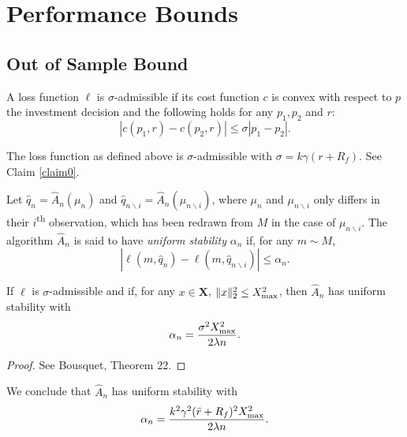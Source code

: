 \documentclass[11pt]{article}
\begin{document}
\section{Performance Bounds}

\subsection{Out of Sample Bound}

\begin{deff}
  A loss function $\ell$ is $\sigma$-admissible if its cost function $c$ is convex with
  respect to $p$ the investment decision and the following holds for any $p_1,p_2$ and
  $r$:
  \begin{equation*}
    |c(p_1,r) - c(p_2,r)| \leq \sigma|p_1-p_2|.
  \end{equation*}
\end{deff}

\begin{rem}
  The loss function as defined above is $\sigma$-admissible with $\sigma=k\gamma(r+R_f)$. See
  Claim \ref{claim0}.
\end{rem}

\begin{deff}
  Let $\hat q_n=\hat A_n(\mu_n)$ and
  $\hat q_{n\backslash i}=\hat A_n(\mu_{n\backslash i})$, where $\mu_n$ and
  $\mu_{n\backslash i}$ only differs in their $i$\textsuperscript{th} observation, which
  has been redrawn from $M$ in the case of $\mu_{n\backslash i}$. The algorithm $\hat A_n$
  is said to have \textsl{uniform stability} $\alpha_n$ if, for any $m\sim M$,
  \begin{equation*}
    |\ell(m,\hat q_n) - \ell(m,\hat q_{n\backslash i})| \leq \alpha_n. 
  \end{equation*}
\end{deff}

\begin{thm}
  If $\ell$ is $\sigma$-admissible and if, for any $x\in\bm X$, $\|x\|_2^2\leq X_{\max}^2$,
  then $\hat A_n$ has uniform stability with
  \begin{equation*}
    \alpha_n = \frac{\sigma^2 X_{\max}^2}{2\lambda n}.
  \end{equation*}
\end{thm}

\begin{proof}
  See Bousquet, Theorem 22. 
\end{proof}

\begin{rem}
  We conclude that $\hat A_n$ has uniform stability with
  \begin{equation*}
    \alpha_n = \frac{k^2\gamma^2(\bar r+R_f)^2X_{\max}^2}{2\lambda n}.
  \end{equation*}
\end{rem}
\end{document}
